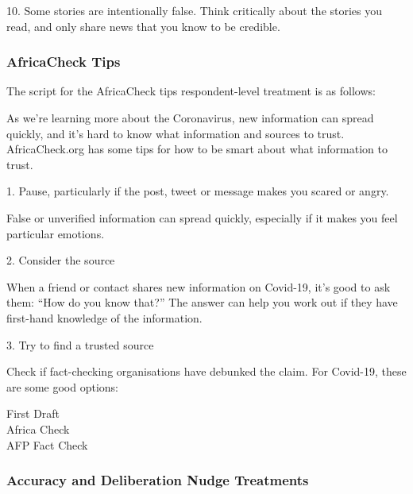 \documentclass[letterpaper, 12pt, parskip=full,DIV=10]{scrartcl}
\begin{document}
10. Some stories are intentionally false. Think critically about the stories you read, and only share news that you know to be credible.



\subsubsection{AfricaCheck Tips}\label{sec:actips}
The script for the AfricaCheck tips respondent-level treatment is as follows:

As we're learning more about the Coronavirus, new information can spread quickly, and it's hard to know what information and sources to trust. AfricaCheck.org has some tips for how to be smart about what information to trust. 

1. Pause, particularly if the post, tweet or message makes you scared or angry. 

False or unverified information can spread quickly, especially if it makes you feel particular emotions.

2. Consider the source

When a friend or contact shares new information on Covid-19, it’s good to ask them: “How do you know that?” The answer can help you work out if they have first-hand knowledge of the information.

3. Try to find a trusted source

Check if fact-checking organisations have debunked the claim. For Covid-19, these are some good options:

First Draft\\
Africa Check\\
AFP Fact Check

%
%


\subsubsection{Accuracy and Deliberation Nudge Treatments}\label{sec:nudge}
\end{document}
